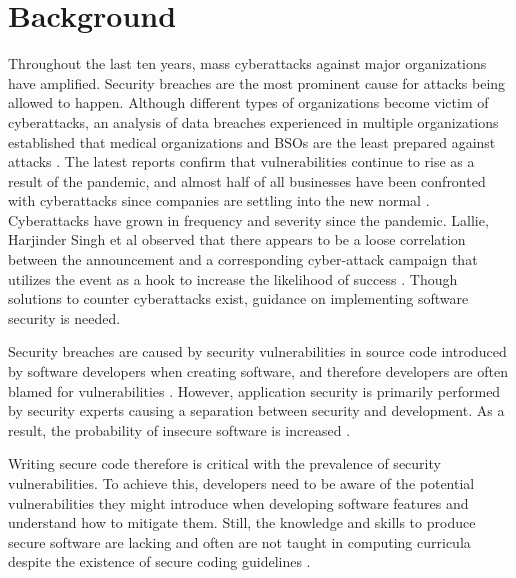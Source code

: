 \section{Background}
Throughout the last ten years, mass cyberattacks against major organizations have amplified. Security breaches are the most prominent cause for attacks being allowed to happen. Although different types of organizations become victim of cyberattacks, an analysis of data breaches experienced in multiple organizations established that medical organizations and BSOs are the least prepared against attacks \cite{Hammouchi_2019}. The latest reports confirm that vulnerabilities continue to rise as a result of the pandemic, and almost half of all businesses have been confronted with cyberattacks since companies are settling into the new normal \cite{Weir_2021}. Cyberattacks have grown in frequency and severity since the pandemic. Lallie, Harjinder Singh et al observed that there appears to be a loose correlation between the announcement and a corresponding cyber-attack campaign that utilizes the event as a hook to increase the likelihood of success \cite{Lallie_2021}. Though solutions to counter cyberattacks exist, guidance on implementing software security is needed.

Security breaches are caused by security vulnerabilities in source code introduced by software developers when creating software, and therefore developers are often blamed for vulnerabilities \cite{Assal_2019}. However, application security is primarily performed by security experts causing a separation between security and development. As a result, the probability of insecure software is increased \cite{Thomas_2018}.

Writing secure code therefore is critical with the prevalence of security vulnerabilities. To achieve this, developers need to be aware of the potential vulnerabilities they might introduce when developing software features and understand how to mitigate them. Still, the knowledge and skills to produce secure software are lacking and often are not taught in computing curricula despite the existence of secure coding guidelines \cite{Tabassum_2018} \cite{yu2011teaching} \cite{Espinha_Gasiba_2021} \cite{blindspot_2018}.

